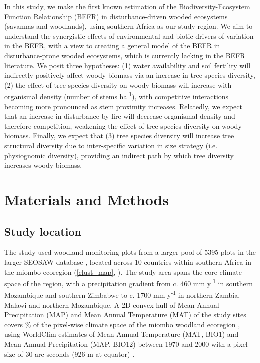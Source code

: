 \documentclass[12pt,a4paper]{article}
\begin{document}
In this study, we make the first known estimation of the Biodiversity-Ecosystem Function Relationship (BEFR) in disturbance-driven wooded ecosystems (savannas and woodlands), using southern Africa as our study region. We aim to understand the synergistic effects of environmental and biotic drivers of variation in the BEFR, with a view to creating a general model of the BEFR in disturbance-prone wooded ecosystems, which is currently lacking in the BEFR literature. We posit three hypotheses: (1) water availability and soil fertility will indirectly positively affect woody biomass via an increase in tree species diversity, (2) the effect of tree species diversity on woody biomass will increase with organismal density (number of stems ha\textsuperscript{-1}), with competitive interactions becoming more pronounced as stem proximity increases. Relatedly, we expect that an increase in disturbance by fire will decrease organismal density and therefore competition, weakening the effect of tree species diversity on woody biomass. Finally, we expect that (3) tree species diversity will increase tree structural diversity due to inter-specific variation in size strategy (i.e. physiognomic diversity), providing an indirect path by which tree diversity increases woody biomass.

\section{Materials and Methods}

\subsection{Study location}

The study used \nplots{} woodland monitoring plots from a larger pool of 5395 plots in the larger SEOSAW database \citep{SEOSAW2020}, located across 10 countries within southern Africa in the miombo ecoregion (\autoref{clust_map}, \citealp{White1987}). The study area spans the core climate space of the region, with a precipitation gradient from c. 460 mm y\textsuperscript{-1} in southern Mozambique and southern Zimbabwe to c. 1700 mm y\textsuperscript{-1} in northern Zambia, Malawi and northern Mozambique. A 2D convex hull of Mean Annual Precipitation (MAP) and Mean Annual Temperature (MAT) of the study sites covers \hullcover{}\% of the pixel-wise climate space of the miombo woodland ecoregion \citep{White1987}, using WorldClim estimates of Mean Annual Temperature (MAT, BIO1) and Mean Annual Precipitation (MAP, BIO12) between 1970 and 2000 with a pixel size of 30 arc seconds (926 m at equator) \citep{Fick2017}. 
\end{document}
